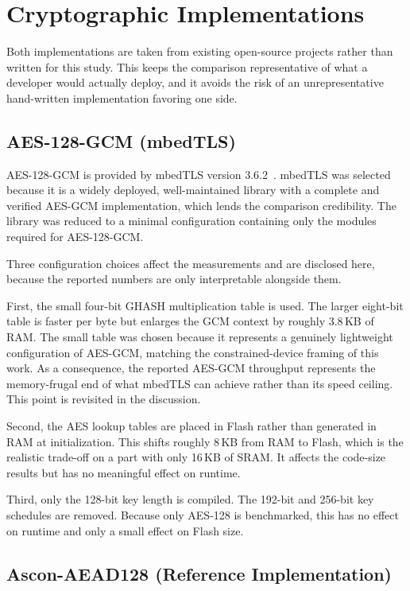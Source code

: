 \section{Cryptographic Implementations}

Both implementations are taken from existing open-source projects rather than
written for this study.
This keeps the comparison representative of what a developer would actually
deploy, and it avoids the risk of an unrepresentative hand-written
implementation favoring one side.

\subsection{AES-128-GCM (mbedTLS)}

AES-128-GCM is provided by mbedTLS version 3.6.2~\cite{mbedTLS}.
mbedTLS was selected because it is a widely deployed, well-maintained library
with a complete and verified AES-GCM implementation, which lends the comparison
credibility.
The library was reduced to a minimal configuration containing only the modules
required for AES-128-GCM.

Three configuration choices affect the measurements and are disclosed here,
because the reported numbers are only interpretable alongside them.

First, the small four-bit GHASH multiplication table is used.
The larger eight-bit table is faster per byte but enlarges the GCM context by
roughly 3.8\,KB of RAM.
The small table was chosen because it represents a genuinely lightweight
configuration of AES-GCM, matching the constrained-device framing of this work.
As a consequence, the reported AES-GCM throughput represents the memory-frugal
end of what mbedTLS can achieve rather than its speed ceiling.
This point is revisited in the discussion.

Second, the AES lookup tables are placed in Flash rather than generated in RAM
at initialization.
This shifts roughly 8\,KB from RAM to Flash, which is the realistic trade-off
on a part with only 16\,KB of SRAM.
It affects the code-size results but has no meaningful effect on runtime.

Third, only the 128-bit key length is compiled.
The 192-bit and 256-bit key schedules are removed.
Because only AES-128 is benchmarked, this has no effect on runtime and only a
small effect on Flash size.

\subsection{Ascon-AEAD128 (Reference Implementation)}

